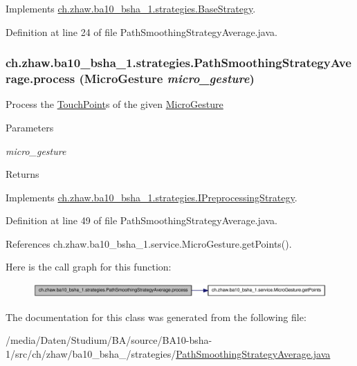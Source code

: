 Implements \hyperlink{classch_1_1zhaw_1_1ba10__bsha__1_1_1strategies_1_1BaseStrategy_a0496e8fd0099a5f0f7765322d7e752a9}{ch.zhaw.ba10\_\-bsha\_\-1.strategies.BaseStrategy}.

Definition at line 24 of file PathSmoothingStrategyAverage.java.\hypertarget{classch_1_1zhaw_1_1ba10__bsha__1_1_1strategies_1_1PathSmoothingStrategyAverage_a1f021ea53245e6ebfa044ca3bb8b0210}{
\subsubsection[{process}]{ ch.zhaw.ba10\_\-bsha\_\-1.strategies.PathSmoothingStrategyAverage.process ({\bf MicroGesture} {\em micro\_\-gesture})}}
\label{classch_1_1zhaw_1_1ba10__bsha__1_1_1strategies_1_1PathSmoothingStrategyAverage_a1f021ea53245e6ebfa044ca3bb8b0210}
Process the \hyperlink{classch_1_1zhaw_1_1ba10__bsha__1_1_1TouchPoint}{TouchPoint}s of the given \hyperlink{}{MicroGesture}


\begin{DoxyParams}{Parameters}
\item[{\em micro\_\-gesture}]\end{DoxyParams}
\begin{DoxyReturn}{Returns}

\end{DoxyReturn}


Implements \hyperlink{interfacech_1_1zhaw_1_1ba10__bsha__1_1_1strategies_1_1IPreprocessingStrategy_a3e3885dce8fda7b79dc514078f11ad62}{ch.zhaw.ba10\_\-bsha\_\-1.strategies.IPreprocessingStrategy}.

Definition at line 49 of file PathSmoothingStrategyAverage.java.

References ch.zhaw.ba10\_\-bsha\_\-1.service.MicroGesture.getPoints().

Here is the call graph for this function:\nopagebreak
\begin{figure}[H]
\begin{center}
\leavevmode
\includegraphics[width=335pt]{classch_1_1zhaw_1_1ba10__bsha__1_1_1strategies_1_1PathSmoothingStrategyAverage_a1f021ea53245e6ebfa044ca3bb8b0210_cgraph}
\end{center}
\end{figure}


The documentation for this class was generated from the following file:\begin{DoxyCompactItemize}
\item 
/media/Daten/Studium/BA/source/BA10-\/bsha-\/1/src/ch/zhaw/ba10\_\-bsha\_/strategies/\hyperlink{PathSmoothingStrategyAverage_8java}{PathSmoothingStrategyAverage.java}\end{DoxyCompactItemize}

